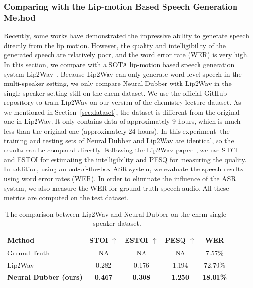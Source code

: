 \documentclass{article}
\begin{document}
\subsubsection{Comparing with the Lip-motion Based Speech Generation Method}
Recently, some works have demonstrated the impressive ability to generate speech directly from the lip motion. However, the quality and intelligibility of the generated speech are relatively poor, and the word error rate (WER) is very high. In this section, we compare with a SOTA lip-motion based speech generation system Lip2Wav~\cite{prajwal2020learning}. Because Lip2Wav can only generate word-level speech in the multi-speaker setting, we only compare Neural Dubber with Lip2Wav in the single-speaker setting still on the chem dataset. We use the official GitHub repository
to train Lip2Wav on our version of the chemistry lecture dataset. As we mentioned in Section~\ref{sec:dataset}, the dataset is different from the original one in Lip2Wav. It only contains data of approximately 9 hours, which is much less than the original one (approximately 24 hours). In this experiment, the training and testing sets of Neural Dubber and Lip2Wav are identical, so the results can be compared directly. Following the Lip2Wav paper~\cite{prajwal2020learning}, we use STOI and ESTOI for estimating the intelligibility and PESQ for measuring the quality. In addition, using an out-of-the-box ASR system, we evaluate the speech results using word error rates (WER). In order to eliminate the influence of the ASR system, we also 
measure the WER for ground truth speech audio. All these metrics are computed on the test dataset. 

\begin{table}[htbp]
	\centering
	\small
	\begin{tabular}{ l | c | c | c || c }
		\toprule
		\textbf{Method} &  \textbf{STOI} $\uparrow$ & \textbf{ESTOI} $\uparrow$ & \textbf{PESQ} $\uparrow$ & \textbf{WER} \\ 
		\midrule
		Ground Truth & NA  & NA & NA & 7.57\% \\
	    Lip2Wav & 0.282 & 0.176  & 1.194 & 72.70\% \\
		\textbf{Neural Dubber (ours)} & \textbf{0.467} & \textbf{0.308}  & \textbf{1.250} & \textbf{18.01\%} \\
		\bottomrule
	\end{tabular}
	\vspace{0.3cm}
	\caption{
    The comparison between Lip2Wav and Neural Dubber on the chem single-speaker dataset.
    }
    \label{tab:cmp-lip2wav}
	\vspace{-0.5cm}
\end{table}
\end{document}
